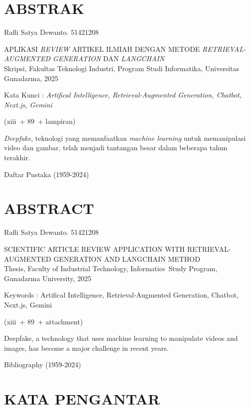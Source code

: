 \documentclass[12pt,oneside,bahasa]{book}
\newcommand{\Judul}{Aplikasi \textit {Review} Artikel Ilmiah dengan metode \textit {Retrieval-Augmented Generation} Dan \textit {Langchain} }
\newcommand{\JudulInggris}{Scientific Article Review Application with Retrieval-Augmented Generation and Langchain method}
\newcommand{\Penulis}{Rafli Satya Dewanto}
\newcommand{\NPM}{51421208}
\newcommand{\Fakultas}{Teknologi Industri}
\newcommand{\Faculty}{Industrial Technology}
\newcommand{\Jurusan}{Informatika}
\newcommand{\Major}{Informatics}
\newcommand{\Tahun}{2025}
\newcommand{\KataKunci}{\textit{Artifical Intelligence, Retrieval-Augmented Generation, Chatbot, Next.js, Gemini}}
\newcommand{\KeyWords}{Artifical Intelligence, Retrieval-Augmented Generation, Chatbot, Next.js, Gemini}
\newcommand{\JumlahHalaman}{89}
\newcommand{\JumlahHalamanDepan}{xiii}
\newcommand{\TahunPustaka}{1959-2024}
\begin{document}
\chapter*{ABSTRAK}

\begin{singlespace}

\noindent\Penulis. \NPM

\noindent\MakeUppercase{\Judul} \\
Skripsi, Fakultas \Fakultas, Program Studi \Jurusan, Universitas
Gunadarma, \Tahun

\noindent Kata Kunci : \KataKunci

\medskip{}

\noindent (\JumlahHalamanDepan \ + \JumlahHalaman \ + lampiran)

\bigskip{}

\emph{Deepfake}, teknologi yang memanfaatkan \emph{machine learning}
untuk memanipulasi video dan gambar, telah menjadi tantangan besar
dalam beberapa tahun terakhir.

\bigskip{}

\noindent Daftar Pustaka (\TahunPustaka)
\end{singlespace}

\chapter*{ABSTRACT}

\begin{singlespace}

\noindent\Penulis. \NPM

\noindent\MakeUppercase{\JudulInggris} \\
Thesis, Faculty of \Faculty, \Major\ Study Program, Gunadarma University,
\Tahun

\noindent Keywords : \KeyWords

\medskip{}

\noindent (\JumlahHalamanDepan \ + \JumlahHalaman \ + attachment)

\bigskip{}

Deepfake, a technology that uses machine learning to manipulate videos
and images, has become a major challenge in recent years.

\bigskip{}

\noindent Bibliography (\TahunPustaka)
\end{singlespace}

\chapter*{KATA PENGANTAR}
\end{document}
